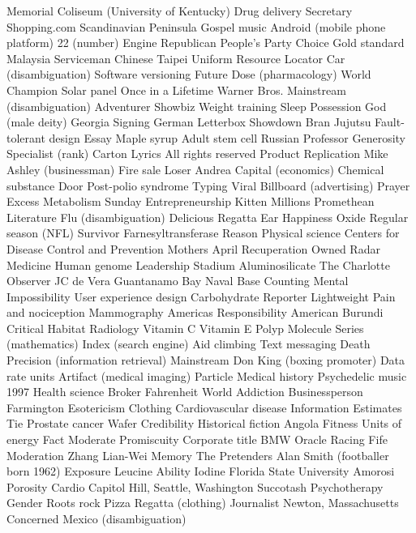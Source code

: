 Memorial Coliseum (University of Kentucky)  Drug delivery  Secretary  
Shopping.com  Scandinavian Peninsula  Gospel music  
Android (mobile phone platform)  22 (number)  Engine  
Republican People's Party  Choice  Gold standard  
Malaysia  Serviceman  Chinese Taipei  
Uniform Resource Locator  Car (disambiguation)  Software versioning  
Future  Dose (pharmacology)  World Champion  
Solar panel  Once in a Lifetime  Warner Bros.  
Mainstream (disambiguation)  Adventurer  Showbiz  
Weight training  Sleep  Possession  
God (male deity)  Georgia  Signing  
German  Letterbox  Showdown  
Bran  Jujutsu  Fault-tolerant design  
Essay  Maple syrup  Adult stem cell  
Russian  Professor  Generosity  
Specialist (rank)  Carton  Lyrics  
All rights reserved  Product  Replication  
Mike Ashley (businessman)  Fire sale  Loser  
Andrea  Capital (economics)  Chemical substance  
Door  Post-polio syndrome  Typing  
Viral  Billboard (advertising)  Prayer  
Excess  Metabolism  Sunday  
Entrepreneurship  Kitten  Millions  
Promethean  Literature  Flu (disambiguation)  
Delicious  Regatta  Ear  
Happiness  Oxide  Regular season (NFL)  
Survivor  Farnesyltransferase  Reason  
Physical science  Centers for Disease Control and Prevention  Mothers  
April  Recuperation  Owned  
Radar  Medicine  Human genome  
Leadership  Stadium  Aluminosilicate  
The Charlotte Observer  JC de Vera  Guantanamo Bay Naval Base  
Counting  Mental  Impossibility  
User experience design  Carbohydrate  Reporter  
Lightweight  Pain and nociception  Mammography  
Americas  Responsibility  American  
Burundi  Critical  Habitat  
Radiology  Vitamin C  Vitamin E  
Polyp  Molecule  Series (mathematics)  
Index (search engine)  Aid climbing  Text messaging  
Death  Precision (information retrieval)  Mainstream  
Don King (boxing promoter)  Data rate units  Artifact (medical imaging)  
Particle  Medical history  Psychedelic music  
1997  Health science  Broker  
Fahrenheit  World  Addiction  
Businessperson  Farmington  Esotericism  
Clothing  Cardiovascular disease  Information  
Estimates  Tie  Prostate cancer  
Wafer  Credibility  Historical fiction  
Angola  Fitness  Units of energy  
Fact  Moderate  Promiscuity  
Corporate title  BMW Oracle Racing  Fife  
Moderation  Zhang Lian-Wei  Memory  
The Pretenders  Alan Smith (footballer born 1962)  Exposure  
Leucine  Ability  Iodine  
Florida State University  Amorosi  Porosity  
Cardio  Capitol Hill, Seattle, Washington  Succotash  
Psychotherapy  Gender  Roots rock  
Pizza  Regatta (clothing)  Journalist  
Newton, Massachusetts  Concerned  Mexico (disambiguation)  
